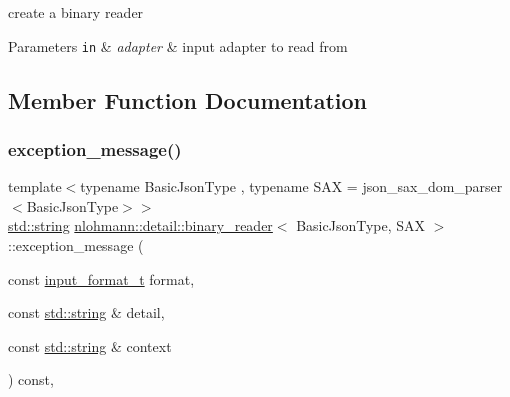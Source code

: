 create a binary reader 


\begin{DoxyParams}[1]{Parameters}
\mbox{\tt in}  & {\em adapter} & input adapter to read from \\
\hline
\end{DoxyParams}


\subsection{Member Function Documentation}
\mbox{\label{classnlohmann_1_1detail_1_1binary__reader_a82b86133c98a0565446a44dfd3e418e6}} 
\subsubsection{\texorpdfstring{exception\+\_\+message()}{exception\_message()}}
{\footnotesize\ttfamily template$<$typename Basic\+Json\+Type , typename S\+AX  = json\+\_\+sax\+\_\+dom\+\_\+parser$<$\+Basic\+Json\+Type$>$$>$ \\
\mbox{\hyperlink{namespacenlohmann_1_1detail_a1ed8fc6239da25abcaf681d30ace4985ab45cffe084dd3d20d928bee85e7b0f21}{std\+::string}} \mbox{\hyperlink{classnlohmann_1_1detail_1_1binary__reader}{nlohmann\+::detail\+::binary\+\_\+reader}}$<$ Basic\+Json\+Type, S\+AX $>$\+::exception\+\_\+message (\begin{DoxyParamCaption}\item[{const \mbox{\hyperlink{namespacenlohmann_1_1detail_aa554fc6a11519e4f347deb25a9f0db40}{input\+\_\+format\+\_\+t}}}]{format,  }\item[{const \mbox{\hyperlink{namespacenlohmann_1_1detail_a1ed8fc6239da25abcaf681d30ace4985ab45cffe084dd3d20d928bee85e7b0f21}{std\+::string}} \&}]{detail,  }\item[{const \mbox{\hyperlink{namespacenlohmann_1_1detail_a1ed8fc6239da25abcaf681d30ace4985ab45cffe084dd3d20d928bee85e7b0f21}{std\+::string}} \&}]{context }\end{DoxyParamCaption}) const\hspace{0.3cm}{\ttfamily [inline]}, {\ttfamily [private]}}


